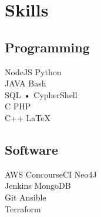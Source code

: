 \documentclass[]{deedy-resume-openfont}
\begin{document}
\begin{minipage}[t][18cm]{0.33\textwidth}

\section{Skills}
\subsection{Programming}
NodeJS \textbullet{} Python \\
JAVA \textbullet{} Bash \\
 SQL \textbf{•} CypherShell \\
C \textbullet{} PHP \\
C++ \textbullet{} \LaTeX\
\sectionsep

\subsection{Software}
AWS \textbullet{} ConcourseCI \textbullet{} Neo4J \\
Jenkins \textbullet{} MongoDB\\
Git \textbullet{} Ansible \\
Terraform
\sectionsep


%
%

\end{minipage}
\hfill
\end{document}
